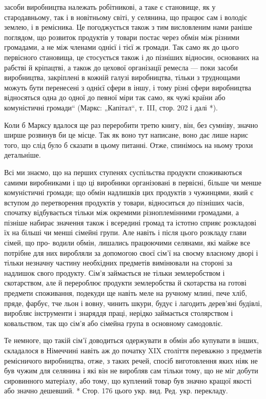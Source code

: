 \parcont{}  %
засоби виробництва належать робітникові, а таке є становище, як у стародавньому, так і в новітньому світі, у селянина, що працює сам і володіє землею, і в ремісника. Це погоджується також з тим висловленим нами раніше поглядом, що розвиток
продуктів у товари постає через обмін між різними громадами, а не між членами однієї і тієї ж громади. Так само як до цього
первісного становища, це стосується також і до пізніших відносин, основаних на рабстві й кріпацтві, а також до цехової
організації ремесла — поки засоби виробництва, закріплені в кожній галузі виробництва, тільки з труднощами можуть бути
перенесені з однієї сфери в іншу, і тому різні сфери виробництва відносяться одна до одної до певної міри так само, як чужі
країни або комуністичні громади“ (Маркс: „Капітал“,  т. III, стор. 202 і далі *).

Коли б Марксу вдалося ще раз переробити третю книгу, він, без сумніву, значно ширше розвинув би це місце. Так як воно тут
написане, воно дає лише нарис того, що слід було б сказати в цьому питанні. Отже, спинімось на ньому трохи детальніше.

Всі ми знаємо, що на перших ступенях суспільства продукти споживаються самими виробниками і що ці виробники організовані в
первісні, більше чи менше комуністичні громади; що обмін надлишків цих продуктів з чужинцями, який є вступом до перетворення
продуктів у товари, відноситься до пізніших часів, спочатку відбувається тільки між окремими різноплемінними громадами, а
пізніше набирає значення також і всередині громад та істотно сприяє розкладові їх на більші чи менші сімейні групи. Але
навіть і після цього розкладу глави сімей, що про- водили обмін, лишались працюючими селянами, які майже все потрібне для
них виробляли за допомогою своєї сім’ї на своєму власному дворі і тільки незначну частину необхідних предметів вимінювали на
стороні за надлишок свого продукту. Сім’я займається не тільки землеробством і скотарством, але й перероблює продукти
землеробства й скотарства на готові предмети споживання, подекуди ще навіть меле на ручному млині, пече хліб, пряде, фарбує,
тче льон і вовну, чинить шкури, будує і лагодить дерев’яні будівлі, виробляє інструменти і знаряддя праці, нерідко
займається столярством і ковальством, так що сім’я або сімейна група в основному самодовліє.

Те немноге, що такій сім’ї
доводиться одержувати в обмін або купувати в інших, складалося в Німеччині навіть аж до початку XIX століття переважно з
предметів ремісничого виробництва, отже, з таких речей, спосіб виготовлення яких ніяк не був чужим для селянина і які він не
виробляв сам тільки тому, що не міг добути сировинного матеріалу, або тому, що куплений товар був значно кращої якості або
значно дешевший.
* Стор. 176 цього укр. вид. Ред. укр. перекладу.
